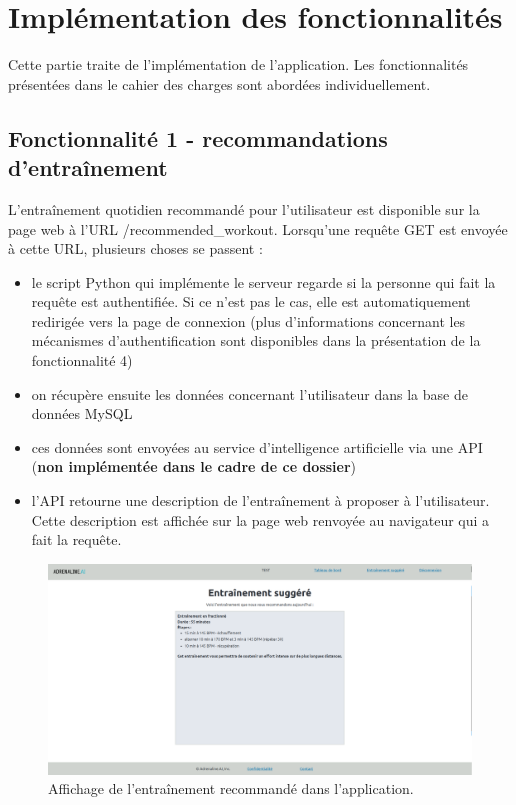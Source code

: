 \documentclass[french]{article}
\begin{document}
    \section{Implémentation des fonctionnalités}
    Cette partie traite de l'implémentation de l'application. Les fonctionnalités présentées dans le cahier des charges sont abordées individuellement.
    \subsection{Fonctionnalité 1 - recommandations d'entraînement}

    L'entraînement quotidien recommandé pour l'utilisateur est disponible sur la page web à l'URL /recommended\_workout. Lorsqu'une requête GET est envoyée à cette URL, plusieurs choses se passent :
    \begin{itemize}
        \item le script Python qui implémente le serveur regarde si la personne qui fait la requête est authentifiée. Si ce n'est pas le cas, elle est automatiquement redirigée vers la page de connexion (plus d'informations concernant les mécanismes d'authentification sont disponibles dans la présentation de la fonctionnalité 4)
        \item on récupère ensuite les données concernant l'utilisateur dans la base de données MySQL
        \item ces données sont envoyées au service d'intelligence artificielle via une API (\textbf{non implémentée dans le cadre de ce dossier})
        \item l'API retourne une description de l'entraînement à proposer à l'utilisateur. Cette description est affichée sur la page web renvoyée au navigateur qui a fait la requête.
    \end{itemize}
    \begin{figure}[h!]
        \includegraphics[width=12cm]{recommandation}
        \centering
        \caption{Affichage de l'entraînement recommandé dans l'application.}
        \centering
    \end{figure}
\end{document}
